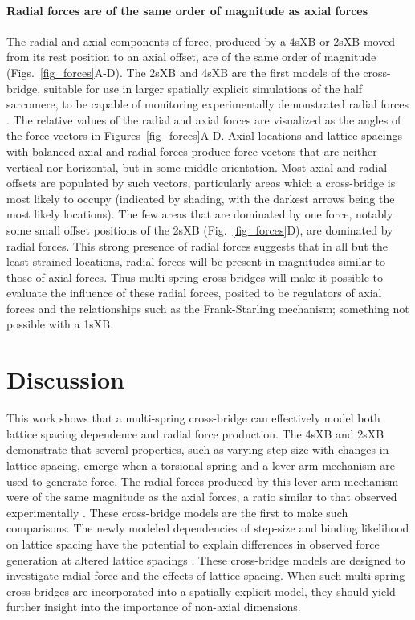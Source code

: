 \documentclass[]{article}
\begin{document}
\paragraph{Radial forces are of the same order of magnitude as axial forces} %
The radial and axial components of force, produced by a 4sXB or 2sXB moved from its rest position to an axial offset, are of the same order of magnitude (Figs.~\ref{fig_forces}A-D). 
The 2sXB and 4sXB are the first models of the cross-bridge, suitable for use in larger spatially explicit simulations of the half sarcomere, to be capable of monitoring experimentally demonstrated radial forces \citep{Cecchi1990, Millman1998}. 
The relative values of the radial and axial forces are visualized as the angles of the force vectors in Figures~\ref{fig_forces}A-D. 
Axial locations and lattice spacings with balanced axial and radial forces produce force vectors that are neither vertical nor horizontal, but in some middle orientation.
Most axial and radial offsets are populated by such vectors, particularly areas which a cross-bridge is most likely to occupy (indicated by shading, with the darkest arrows being the most likely locations). 
The few areas that are dominated by one force, notably some small offset positions of the 2sXB (Fig.~\ref{fig_forces}D), are dominated by radial forces.
This strong presence of radial forces suggests that in all but the least strained locations, radial forces will be present in magnitudes similar to those of axial forces. 
Thus multi-spring cross-bridges will make it possible to evaluate the influence of these radial forces, posited to be regulators of axial forces and the relationships such as the Frank-Starling mechanism; something not possible with a 1sXB\@. 



\section*{Discussion} %

This work shows that a multi-spring cross-bridge can effectively model both lattice spacing dependence and radial force production. 
The 4sXB and 2sXB demonstrate that several properties, such as varying step size with changes in lattice spacing, emerge when a torsional spring and a lever-arm mechanism are used to generate force. 
The radial forces produced by this lever-arm mechanism were of the same magnitude as the axial forces, a ratio similar to that observed experimentally \citep{Cecchi1990,Brenner1991}. 
These cross-bridge models are the first to make such comparisons.
The newly modeled dependencies of step-size and binding likelihood on lattice spacing have the potential to explain differences in observed force generation at altered lattice spacings  \citep{Millman1998}. 
These cross-bridge models are designed to investigate radial force and the effects of lattice spacing. 
When such multi-spring cross-bridges are incorporated into a spatially explicit model, they should yield further insight into the importance of non-axial dimensions. 
\end{document}
